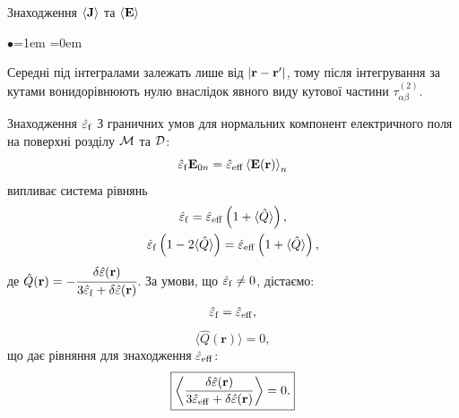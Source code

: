 \documentclass[10pt]{beamer}
\begin{document}
\begin{frame}{Знаходження $\langle {\bf J} \rangle$ та $\langle {\bf E} \rangle$}
\begin{list}{$\bullet$}{\leftmargin=1em \itemindent=0em}
\item
Середні під інтегралами залежать лише від $|{\bf r} - {\bf r}'|$, тому після інтегрування за кутами вонидорівнюють нулю внаслідок явного виду кутової частини $\tau_{\alpha\beta}^{(2)}$.


\end{list}

\end{frame}

\begin{frame}{Знаходження $\hat{\varepsilon}_{\rm f}$}
\footnotesize
З граничних умов для нормальних компонент електричного поля на поверхні розділу $\cal{M}$ та $\cal{D}$:
\begin{equation} \label{eq:boundarycondition}
\hat{\varepsilon}_{\rm
f} {\mathbf{E}}_{0n} = \hat{\varepsilon}_{\rm eff}
\left\langle{\mathbf{E}}({\mathbf{r}})\right\rangle_n
\end{equation}
випливає система рівнянь
\begin{equation}
\label{eq:system}
\begin{gathered}
\hat{ \varepsilon}_{\rm f} =\hat{\varepsilon}_{\rm eff}
\left(1+\langle \hat{Q}\rangle\right),\\
\hat{\varepsilon}_{\rm f}\left(1-2\langle \hat{Q}\rangle\right)
=\hat{\varepsilon}_{\rm eff} \left(1+\langle
\hat{Q}\rangle\right),
\end{gathered}
\end{equation}
де $\hat{Q}({\bf r}) = - \cfrac{\delta\hat{\varepsilon}({\bf r}) }{3 \hat{\varepsilon}_{\rm f} + \delta\hat{\varepsilon}({\bf r})}$. За умови, що $\hat{\varepsilon}_{\rm f} \neq 0$, дістаємо:
\begin{equation} \label{eq:ef} 
\hat{ \varepsilon}_{\rm f} = \hat{ \varepsilon}_{\rm eff},
\end{equation}
\begin{equation} \label{eq:equation}
\langle \hat{Q}({\mathbf{r}})\rangle  = 0,
\end{equation}
що дає рівняння для знаходження $\hat{\varepsilon}_{\rm eff}$:
\begin{equation} \label{eq:equation}
\boxed{
\left\langle \frac{\delta\hat{\varepsilon}({\bf r}) }{3 \hat{\varepsilon}_{\rm eff} + \delta\hat{\varepsilon}({\bf r})} \right\rangle = 0.
}
\end{equation}

\end{frame}
\end{document}
